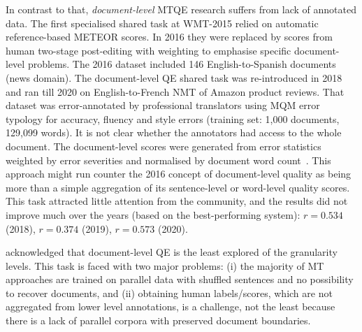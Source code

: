 In contrast to that, \textit{document-level} MTQE research suffers from lack of annotated data. The first specialised shared task at WMT-2015 relied on automatic reference-based \gls{METEOR} scores. In 2016 they were replaced by scores from human two-stage post-editing with weighting to emphasise specific document-level problems. 
The 2016 dataset included 146 English-to-Spanish documents (news domain).
The document-level QE shared task was re-introduced in 2018 and ran till 2020 on English-to-French NMT of Amazon product reviews. That dataset was error-annotated by professional translators using \gls{MQM} error typology for accuracy, fluency and style errors (training set: 1,000 documents, 129,099 words). It is not clear whether the annotators had access to the whole document. The document-level scores were generated from error statistics weighted by error severities and normalised by document word count~\cite{Specia2018wmt}. This approach might run counter the 2016 concept of document-level quality as being more than a simple aggregation of its sentence-level or word-level quality scores. 
\label{pg:MTQE_doc-level_r}
This task attracted little attention from the community, and the results did not improve much over the years (based on the best-performing system): $r=0.534$ (2018), $r=0.374$ (2019), $r=0.573$ (2020). 

\citet{Specia2018a} acknowledged that document-level QE is the least explored of the granularity levels. This task is faced with two major problems: (i) the majority of MT approaches are trained on parallel data with shuffled sentences and no possibility to recover documents, and (ii) obtaining human labels/scores, which are not aggregated from lower level annotations, is a challenge, not the least because there is a lack of parallel corpora with preserved document boundaries. 

